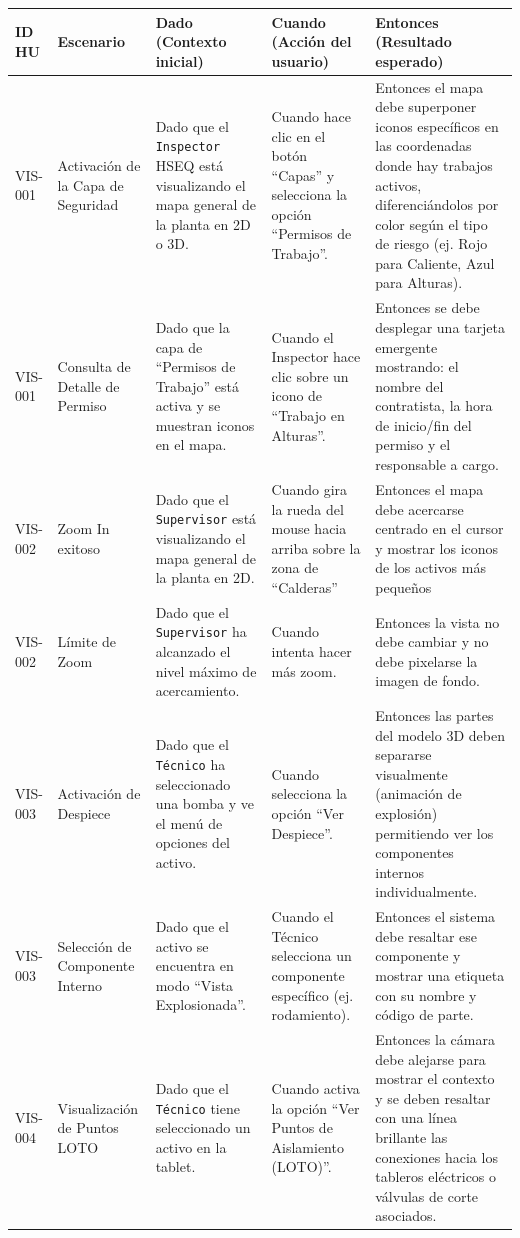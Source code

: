 \documentclass[12pt, a4paper]{article}
\begin{document}
\begin{longtable}{|p{1.8cm}|p{3cm}|p{3.5cm}|p{3.5cm}|p{3.5cm}|}
\hline
\textbf{ID HU} & \textbf{Escenario} & \textbf{Dado (Contexto inicial)} & \textbf{Cuando (Acción del usuario)} & \textbf{Entonces (Resultado esperado)} \\ \hline
VIS-001 & Activación de la Capa de Seguridad & Dado que el \texttt{Inspector} HSEQ está visualizando el mapa general de la planta en 2D o 3D. & Cuando hace clic en el botón ``Capas'' y selecciona la opción ``Permisos de Trabajo''. & Entonces el mapa debe superponer iconos específicos en las coordenadas donde hay trabajos activos, diferenciándolos por color según el tipo de riesgo (ej. Rojo para Caliente, Azul para Alturas). \\ \hline
VIS-001 & Consulta de Detalle de Permiso & Dado que la capa de ``Permisos de Trabajo'' está activa y se muestran iconos en el mapa. & Cuando el Inspector hace clic sobre un icono de ``Trabajo en Alturas''. & Entonces se debe desplegar una tarjeta emergente mostrando: el nombre del contratista, la hora de inicio/fin del permiso y el responsable a cargo. \\ \hline
VIS-002 & Zoom In exitoso & Dado que el \texttt{Supervisor} está visualizando el mapa general de la planta en 2D. & Cuando gira la rueda del mouse hacia arriba sobre la zona de ``Calderas'' & Entonces el mapa debe acercarse centrado en el cursor y mostrar los iconos de los activos más pequeños \\ \hline
VIS-002 & Límite de Zoom & Dado que el \texttt{Supervisor} ha alcanzado el nivel máximo de acercamiento. & Cuando intenta hacer más zoom. & Entonces la vista no debe cambiar y no debe pixelarse la imagen de fondo. \\ \hline
VIS-003 & Activación de Despiece & Dado que el \texttt{Técnico} ha seleccionado una bomba y ve el menú de opciones del activo. & Cuando selecciona la opción ``Ver Despiece''. & Entonces las partes del modelo 3D deben separarse visualmente (animación de explosión) permitiendo ver los componentes internos individualmente. \\ \hline
VIS-003 & Selección de Componente Interno & Dado que el activo se encuentra en modo ``Vista Explosionada''. & Cuando el Técnico selecciona un componente específico (ej. rodamiento). & Entonces el sistema debe resaltar ese componente y mostrar una etiqueta con su nombre y código de parte. \\ \hline
VIS-004 & Visualización de Puntos LOTO & Dado que el \texttt{Técnico} tiene seleccionado un activo en la tablet. & Cuando activa la opción ``Ver Puntos de Aislamiento (LOTO)''. & Entonces la cámara debe alejarse para mostrar el contexto y se deben resaltar con una línea brillante las conexiones hacia los tableros eléctricos o válvulas de corte asociados. \\ \hline

\end{longtable}
\end{document}
